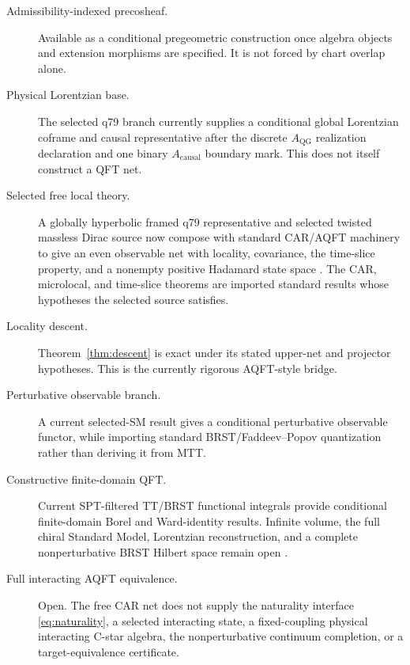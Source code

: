 \documentclass[11pt]{article}
\begin{document}
\begin{description}
\item[Admissibility-indexed precosheaf.] Available as a conditional
pregeometric construction once algebra objects and extension morphisms are
specified.  It is not forced by chart overlap alone.

\item[Physical Lorentzian base.] The selected q79 branch currently supplies a
conditional global Lorentzian coframe and causal representative after the
discrete $A_{\mathrm{QG}}$ realization declaration and one binary
$A_{\mathrm{causal}}$ boundary mark.  This does not itself construct a QFT
net.

\item[Selected free local theory.] A globally hyperbolic framed q79
representative and selected twisted massless Dirac source now compose with
standard CAR/AQFT machinery to give an even observable net with locality,
covariance, the time-slice property, and a nonempty positive Hadamard state
space \cite{SelectedQFT2026}.  The CAR, microlocal, and time-slice theorems
are imported standard results whose hypotheses the selected source satisfies.

\item[Locality descent.] Theorem~\ref{thm:descent} is exact under its stated
upper-net and projector hypotheses.  This is the currently rigorous
AQFT-style bridge.

\item[Perturbative observable branch.] A current selected-SM result gives a
conditional perturbative observable functor, while importing standard
BRST/Faddeev--Popov quantization rather than deriving it from MTT.

\item[Constructive finite-domain QFT.] Current SPT-filtered TT/BRST functional
integrals provide conditional finite-domain Borel and Ward-identity results.
Infinite volume, the full chiral Standard Model, Lorentzian reconstruction,
and a complete nonperturbative BRST Hilbert space remain open
\cite{QFTAudit2026}.

\item[Full interacting AQFT equivalence.] Open.  The free CAR net does not
supply the naturality interface \eqref{eq:naturality}, a selected interacting
state, a fixed-coupling physical interacting C-star algebra, the
nonperturbative continuum completion, or a target-equivalence certificate.
\end{description}
\end{document}
